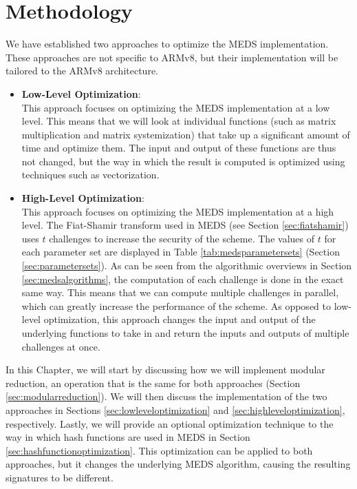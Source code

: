 \documentclass[11pt,a4paper]{report}
\theoremstyle{definition}
\begin{document}
\chapter{Methodology}
\label{ch:methodology}
We have established two approaches to optimize the MEDS implementation. These approaches are not specific to ARMv8, but their implementation will be tailored to the ARMv8 architecture.
\begin{itemize}
  \item \textbf{Low-Level Optimization}:\\
  This approach focuses on optimizing the MEDS implementation at a low level. This means that we will look at individual functions (such as matrix multiplication and matrix systemization) that take up a significant amount of time and optimize them. The input and output of these functions are thus not changed, but the way in which the result is computed is optimized using techniques such as vectorization.
  \item \textbf{High-Level Optimization}:\\
  This approach focuses on optimizing the MEDS implementation at a high level. The Fiat-Shamir transform used in MEDS (see Section \ref{sec:fiatshamir}) uses $t$ challenges to increase the security of the scheme. The values of $t$ for each parameter set are displayed in Table \ref{tab:medsparametersets} (Section \ref{sec:parametersets}). As can be seen from the algorithmic overviews in Section \ref{sec:medsalgorithms}, the computation of each challenge is done in the exact same way. This means that we can compute multiple challenges in parallel, which can greatly increase the performance of the scheme. As opposed to low-level optimization, this approach changes the input and output of the underlying functions to take in and return the inputs and outputs of multiple challenges at once.
\end{itemize}
In this Chapter, we will start by discussing how we will implement modular reduction, an operation that is the same for both approaches (Section \ref{sec:modularreduction}). We will then discuss the implementation of the two approaches in Sections \ref{sec:lowleveloptimization} and \ref{sec:highleveloptimization}, respectively. Lastly, we will provide an optional optimization technique to the way in which hash functions are used in MEDS in Section \ref{sec:hashfunctionoptimization}. This optimization can be applied to both approaches, but it changes the underlying MEDS algorithm, causing the resulting signatures to be different.
\end{document}
